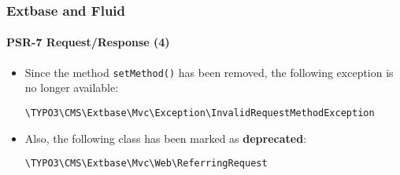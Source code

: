 %

\begin{frame}[fragile]
	\frametitle{Extbase and Fluid}
	\framesubtitle{PSR-7 Request/Response (4)}


	\begin{itemize}
		\item Since the method \texttt{setMethod()} has been removed,
			the following exception is no longer available:
\begin{lstlisting}
\TYPO3\CMS\Extbase\Mvc\Exception\InvalidRequestMethodException
\end{lstlisting}

		\item Also, the following class has been marked as \textbf{deprecated}:
\begin{lstlisting}
\TYPO3\CMS\Extbase\Mvc\Web\ReferringRequest
\end{lstlisting}

	\end{itemize}
\end{frame}

